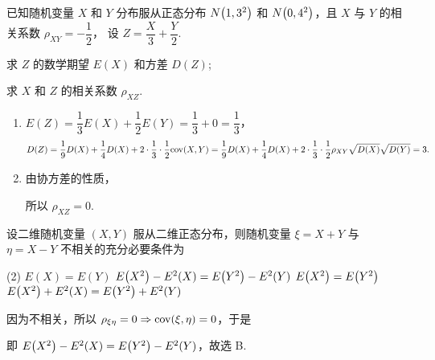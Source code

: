\begin{example}[1994 数一]
    已知随机变量 $X$ 和 $Y$ 分布服从正态分布 $N\qty(1,3^2)$ 和 $N\qty(0,4^2)$，且 $X$ 与 $Y$ 的相关系数 $\rho_{XY}=-\dfrac{1}{2}$，
    设 $Z=\dfrac{X}{3}+\dfrac{Y}{2}$.\newline
    \begin{enumerate*}[label=(\arabic{*})]
        \item 求 $Z$ 的数学期望 $E(X)$ 和方差 $D(Z)$;
        \item 求 $X$ 和 $Z$ 的相关系数 $\rho_{XZ}.$
    \end{enumerate*}
\end{example}
\begin{solution}
    \begin{enumerate}[label=(\arabic{*})]
        \item $E(Z)=\dfrac{1}{3}E(X)+\dfrac{1}{2}E(Y)=\dfrac{1}{3}+0=\dfrac{1}{3}$，
              $$D(Z)=\dfrac{1}{9}D(X)+\dfrac{1}{4}D(X)+2\cdot\dfrac{1}{3}\cdot\dfrac{1}{2}\mathrm{cov}(X,Y)=\dfrac{1}{9}D(X)+\dfrac{1}{4}D(X)+2\cdot\dfrac{1}{3}\cdot\dfrac{1}{2}\rho_{XY}\sqrt{D(X)}\sqrt{D(Y)}=3.$$
        \item 由协方差的性质，
              所以 $\rho_{XZ}=0.$
    \end{enumerate}
\end{solution}

\begin{example}[2000 数一]
    设二维随机变量 $(X,Y)$ 服从二维正态分布，则随机变量 $\xi=X+Y$ 与 $\eta=X-Y$ 不相关的充分必要条件为
    \begin{tasks}(2)
        \task $E(X)=E(Y)$
        \task $E\qty(X^2)-E^2(X)=E\qty(Y^2)-E^2(Y)$
        \task $E\qty(X^2)=E\qty(Y^2)$
        \task $E\qty(X^2)+E^2(X)=E\qty(Y^2)+E^2(Y)$
    \end{tasks}
\end{example}
\begin{solution}
    因为不相关，所以 $\rho_{\xi\eta}=0\Rightarrow \mathrm{cov}(\xi,\eta)=0$，于是
    即 $E\qty(X^2)-E^2(X)=E\qty(Y^2)-E^2(Y)$，故选 B.
\end{solution}

